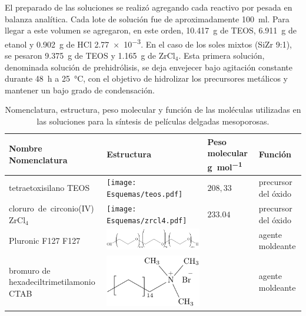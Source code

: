 			El preparado de las soluciones se realizó agregando cada reactivo por pesada en balanza analítica. Cada lote de solución fue de aproximadamente \SI{100}{\ml}. Para llegar a este volumen se agregaron, en este orden, \SI{10.417}{\gram} de TEOS, \SI{6.911}{\gram} de etanol y \SI{0.902}{\gram} de HCl \SI{2,77e-3}{\Molar}. En el caso de los soles mixtos (Si\textbar Zr 9:1), se pesaron \SI{9.375}{\gram} de TEOS y \SI{1.165}{\gram} de ZrCl$_4$. Esta primera solución, denominada solución de prehidrólisis, se deja envejecer bajo agitación constante durante \SI{48}{\hour} a \SI{25}{\celsius}, con el objetivo de hidrolizar los precursores metálicos y mantener un bajo grado de condensación.\cite{Grosso2001}

				\begin{table}[ht!] 
						  \caption[Reactivos para los soles]{Nomenclatura, estructura, peso molecular y función de las moléculas utilizadas en las soluciones para la síntesis de películas delgadas mesoporosas.} 
				  		  \begin{tabular}{>{\raggedright\arraybackslash}m{2.40cm}>{\centering\arraybackslash}m{4cm}>{\centering\arraybackslash}m{2.35cm}>{\raggedright\arraybackslash}m{1.7cm}} 
				  		  \toprule
						  Nombre Nomenclatura    & Estructura & Peso molecular \si{g.mol^{-1}} & Función\\ \midrule
				      	  tetraetoxisilano TEOS & \texttt{[image: Esquemas/teos.pdf]} & $208,33$ & precursor del óxido  \\ \midrule
				      	  \mbox{cloruro de circonio(IV)}  ZrCl$_4$ & \texttt{[image: Esquemas/zrcl4.pdf]} & $233.04$ & precursor del óxido  \\ \midrule
				  		  Pluronic F127 F127    & \hspace*{-10px} \includegraphics[scale=0.5]{Esquemas/f127.pdf} & \multirow{1}{*}{$13800$}	 & agente moldeante	 \\ \midrule
				  		  bromuro de hexadeciltrimetilamonio  CTAB   & \hspace*{1cm} \includegraphics[scale=0.6]{Esquemas/ctab.pdf} & \multirow{1}{*}{$364.48$}	 & agente moldeante	 \\ \midrule

\end{tabular}
\end{table}
